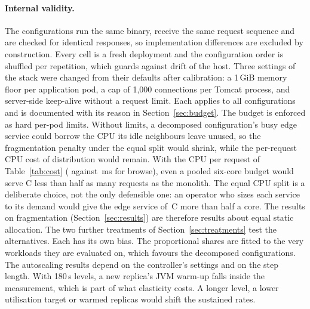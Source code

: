 \paragraph{Internal validity.} The configurations run the same binary, receive the same request sequence and are
checked for identical responses, so implementation differences are excluded by construction. Every cell is a
fresh deployment and the configuration order is shuffled per repetition, which guards against drift of the
host. Three settings of the stack were changed from their defaults after calibration: a 1\,GiB memory floor per
application pod, a cap of 1{,}000 connections per Tomcat process, and server-side keep-alive without a request
limit. Each applies to all configurations and is documented with its reason in Section~\ref{sec:budget}. The budget is enforced as hard per-pod limits. Without limits, a decomposed configuration's busy edge service
could borrow the CPU its idle neighbours leave unused, so the fragmentation penalty under the equal split would
shrink, while the per-request CPU cost of distribution would remain. With the CPU per request of
Table~\ref{tab:cost} ( against \,ms for browse), even a
pooled six-core budget would serve C less than half as many requests as the monolith. The equal CPU split is a deliberate choice, not
the only defensible one: an operator
who sizes each service to its demand would give the edge service of~C more than half a core. The results on
fragmentation (Section~\ref{sec:results}) are therefore results about equal static allocation. The two further
treatments of Section~\ref{sec:treatments} test the alternatives. Each has its own bias. The proportional shares are
fitted to the very workloads they are evaluated on, which favours the decomposed configurations. The autoscaling
results depend on the controller's settings and on the step length. With 180\,s levels, a new replica's JVM
warm-up falls inside the measurement, which is part of what elasticity costs. A longer level, a lower utilisation
target or warmed replicas would shift the sustained rates.

